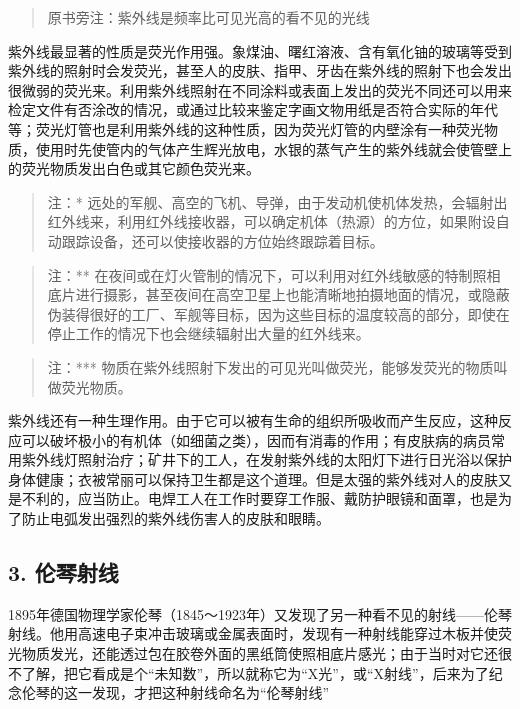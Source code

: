 \begin{quote}
原书旁注：紫外线是频率比可见光高的看不见的光线
\end{quote}

紫外线最显著的性质是荧光作用强。象煤油、曙红溶液、含有氧化铀的玻璃等受到紫外线的照射时会发荧光，甚至人的皮肤、指甲、牙齿在紫外线的照射下也会发出很微弱的荧光来。利用紫外线照射在不同涂料或表面上发出的荧光不同还可以用来检定文件有否涂改的情况，或通过比较来鉴定字画文物用纸是否符合实际的年代等；荧光灯管也是利用紫外线的这种性质，因为荧光灯管的内壁涂有一种荧光物质，使用时先使管内的气体产生辉光放电，水银的蒸气产生的紫外线就会使管壁上的荧光物质发出白色或其它颜色荧光来。

\begin{quote}
注：*
远处的军舰、高空的飞机、导弹，由于发动机使机体发热，会辐射出红外线来，利用红外线接收器，可以确定机体（热源）的方位，如果附设自动跟踪设备，还可以使接收器的方位始终跟踪着目标。
\end{quote}

\begin{quote}
注：**
在夜间或在灯火管制的情况下，可以利用对红外线敏感的特制照相底片进行摄影，甚至夜间在高空卫星上也能清晰地拍摄地面的情况，或隐蔽伪装得很好的工厂、军舰等目标，因为这些目标的温度较高的部分，即使在停止工作的情况下也会继续辐射出大量的红外线来。
\end{quote}

\begin{quote}
注：***
物质在紫外线照射下发出的可见光叫做荧光，能够发荧光的物质叫做荧光物质。
\end{quote}

紫外线还有一种生理作用。由于它可以被有生命的组织所吸收而产生反应，这种反应可以破坏极小的有机体（如细菌之类），因而有消毒的作用；有皮肤病的病员常用紫外线灯照射治疗；矿井下的工人，在发射紫外线的太阳灯下进行日光浴以保护身体健康；衣被常丽可以保持卫生都是这个道理。但是太强的紫外线对人的皮肤又是不利的，应当防止。电焊工人在工作时要穿工作服、戴防护眼镜和面罩，也是为了防止电弧发出强烈的紫外线伤害人的皮肤和眼睛。

\subsection{3. 伦琴射线}

1895年德国物理学家伦琴（1845～1923年）又发现了另一种看不见的射线------伦琴射线。他用高速电子束冲击玻璃或金属表面时，发现有一种射线能穿过木板并使荧光物质发光，还能透过包在胶卷外面的黑纸筒使照相底片感光；由于当时对它还很不了解，把它看成是个``未知数''，所以就称它为``X光''，或``X射线''，后来为了纪念伦琴的这一发现，才把这种射线命名为``伦琴射线''

